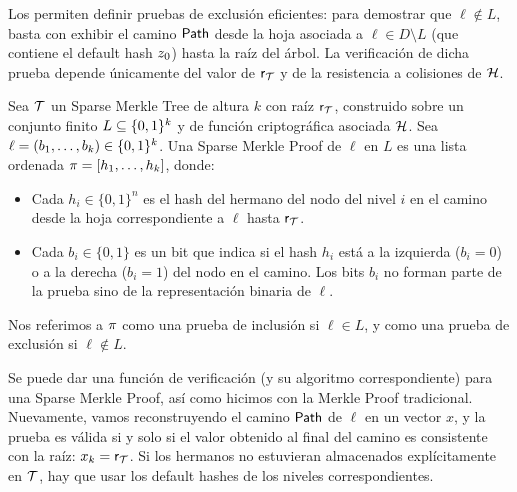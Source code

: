 Los \SMT permiten definir pruebas de exclusión eficientes: para demostrar que $\ell \not\in L$, basta con exhibir el camino $\mathsf{Path}$ desde la hoja asociada a $\ell \in D \setminus {L}$ (que contiene el default hash $z_{0}$) hasta la raíz del árbol. La verificación de dicha prueba depende únicamente del valor de $\mathsf{r}_{\mathcal{T}}$ y de la resistencia a colisiones de $\mathcal{H}$. 

\begin{definition}
\label{def:apendice-a-sparse-merkle-tree-sparse-merkle-proof}
	Sea $\mathcal{T}$ un Sparse Merkle Tree de altura $k$ con raíz $\mathsf{r}_{\mathcal{T}}$, construido sobre un conjunto finito $L \subseteq \{0,1\}^{k}$ y de función criptográfica asociada $\mathcal{H}$. Sea $\ell = (b_1, \ldots, b_k) \in \{0,1\}^{k}$. Una Sparse Merkle Proof de $\ell$ en $L$ es una lista ordenada $\pi = [h_1, \ldots, h_k]$, donde:
	\begin{itemize}
		\item Cada $h_i \in \{0,1\}^n$ es el hash del hermano del nodo del nivel $i$ en el camino desde la hoja correspondiente a $\ell$ hasta $\mathsf{r}_{\mathcal{T}}$.
		\item Cada $b_i \in \{0,1\}$ es un bit que indica si el hash $h_i$ está a la izquierda ($b_i = 0$) o a la derecha ($b_i = 1$) del nodo en el camino. Los bits $b_i$ no forman parte de la prueba sino de la representación binaria de $\ell$.
	\end{itemize}
	Nos referimos a $\pi$ como una prueba de inclusión si $\ell \in L$, y como una prueba de exclusión si $\ell \not\in L$.
\end{definition}

Se puede dar una función de verificación (y su algoritmo correspondiente) para una Sparse Merkle Proof, así como hicimos con la Merkle Proof tradicional. Nuevamente, vamos reconstruyendo el camino $\mathsf{Path}$ de $\ell$ en un vector $x$, y la prueba es válida si y solo si el valor obtenido al final del camino es consistente con la raíz: $x_k = \mathsf{r}_{\mathcal{T}}$. Si los hermanos no estuvieran almacenados explícitamente en $\mathcal{T}$, hay que usar los default hashes de los niveles correspondientes.

